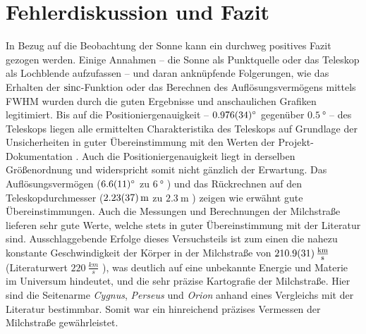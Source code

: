 \section{Fehlerdiskussion und Fazit}
In Bezug auf die Beobachtung der Sonne kann ein durchweg positives Fazit gezogen werden.
Einige Annahmen -- die Sonne als Punktquelle oder das Teleskop als Lochblende aufzufassen -- und daran anknüpfende Folgerungen, wie das Erhalten der $\operatorname{sinc}$-Funktion oder das Berechnen des Auflösungsvermögens mittels FWHM wurden durch die guten Ergebnisse und anschaulichen Grafiken legitimiert.
Bis auf die Positioniergenauigkeit -- $\SI{0.976 \pm 0.034}{\degree}$ gegenüber $\SI{0.5}{\degree}$ -- des Teleskops liegen alle ermittelten Charakteristika des Teleskops auf Grundlage der Unsicherheiten in guter Übereinstimmung mit den Werten der Projekt-Dokumentation \cite{Usermanual}.
Auch die Positioniergenauigkeit liegt in derselben Größenordnung und widerspricht somit nicht gänzlich der Erwartung.
Das Auflösungsvermögen ($\SI{6.6 \pm 1.1}{\degree}$ zu $\SI{6}{\degree}$ \cite{Usermanual}) und das Rückrechnen auf den Teleskopdurchmesser ($\SI{2.23 \pm 0.37}{\metre}$ zu $\SI{2.3}{\metre}$ \cite{Usermanual}) zeigen wie erwähnt gute Übereinstimmungen.\newline
Auch die Messungen und Berechnungen der Milchstraße lieferen sehr gute Werte, welche stets in guter Übereinstimmung mit der Literatur sind. Ausschlaggebende Erfolge dieses Versuchsteils ist zum einen die nahezu konstante Geschwindigkeit der Körper in der Milchstraße von $\SI{210.9 \pm 3.1}{\frac{km}{s}}$ (Literaturwert $\SI{220}{\frac{km}{s}}$ \cite{LSR}), was deutlich auf eine unbekannte Energie und Materie im Universum hindeutet, und die sehr präzise Kartografie der Milchstraße. Hier sind die Seitenarme \textit{Cygnus}, \textit{Perseus} und \textit{Orion} anhand eines Vergleichs mit der Literatur bestimmbar.
Somit war ein hinreichend präzises Vermessen der Milchstraße gewährleistet.